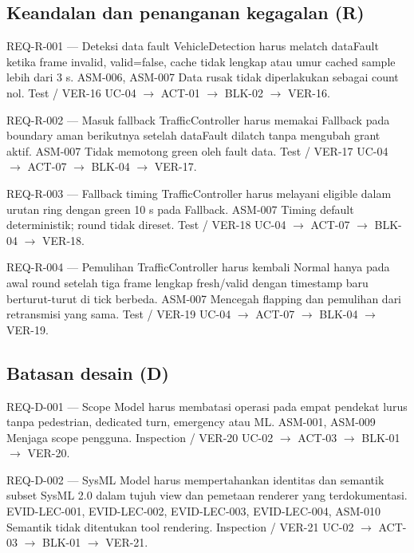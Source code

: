 \subsection{Keandalan dan penanganan kegagalan (R)}

\requirementcard
{REQ-R-001 --- Deteksi data fault}
{VehicleDetection harus melatch dataFault ketika frame invalid, valid=false, cache tidak lengkap atau umur cached sample lebih dari 3 s.}
{ASM-006, ASM-007}
{Data rusak tidak diperlakukan sebagai count nol.}
{Test / VER-16}
{UC-04 $\rightarrow$ ACT-01 $\rightarrow$ BLK-02 $\rightarrow$ VER-16.}

\requirementcard
{REQ-R-002 --- Masuk fallback}
{TrafficController harus memakai Fallback pada boundary aman berikutnya setelah dataFault dilatch tanpa mengubah grant aktif.}
{ASM-007}
{Tidak memotong green oleh fault data.}
{Test / VER-17}
{UC-04 $\rightarrow$ ACT-07 $\rightarrow$ BLK-04 $\rightarrow$ VER-17.}

\requirementcard
{REQ-R-003 --- Fallback timing}
{TrafficController harus melayani eligible dalam urutan ring dengan green 10 s pada Fallback.}
{ASM-007}
{Timing default deterministik; round tidak direset.}
{Test / VER-18}
{UC-04 $\rightarrow$ ACT-07 $\rightarrow$ BLK-04 $\rightarrow$ VER-18.}

\requirementcard
{REQ-R-004 --- Pemulihan}
{TrafficController harus kembali Normal hanya pada awal round setelah tiga frame lengkap fresh/valid dengan timestamp baru berturut-turut di tick berbeda.}
{ASM-007}
{Mencegah flapping dan pemulihan dari retransmisi yang sama.}
{Test / VER-19}
{UC-04 $\rightarrow$ ACT-07 $\rightarrow$ BLK-04 $\rightarrow$ VER-19.}

\subsection{Batasan desain (D)}

\requirementcard
{REQ-D-001 --- Scope}
{Model harus membatasi operasi pada empat pendekat lurus tanpa pedestrian, dedicated turn, emergency atau ML.}
{ASM-001, ASM-009}
{Menjaga scope pengguna.}
{Inspection / VER-20}
{UC-02 $\rightarrow$ ACT-03 $\rightarrow$ BLK-01 $\rightarrow$ VER-20.}

\requirementcard
{REQ-D-002 --- SysML}
{Model harus mempertahankan identitas dan semantik subset SysML 2.0 dalam tujuh view dan pemetaan renderer yang terdokumentasi.}
{EVID-LEC-001, EVID-LEC-002, EVID-LEC-003, EVID-LEC-004, ASM-010}
{Semantik tidak ditentukan tool rendering.}
{Inspection / VER-21}
{UC-02 $\rightarrow$ ACT-03 $\rightarrow$ BLK-01 $\rightarrow$ VER-21.}

\clearpage
